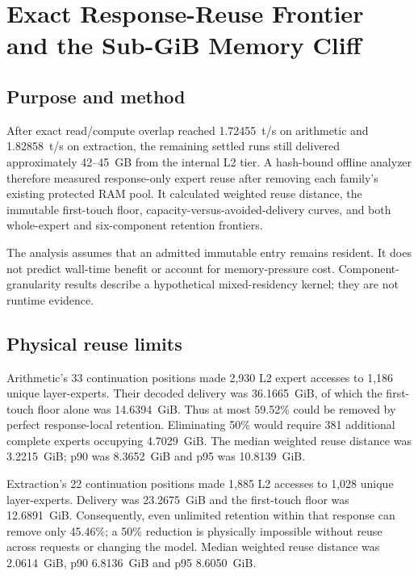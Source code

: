 
\section{Exact Response-Reuse Frontier and the Sub-GiB Memory Cliff}
\label{sec:gptoss120b-exact-reuse-frontier}

\subsection{Purpose and method}

After exact read/compute overlap reached 1.72455~t/s on arithmetic and
1.82858~t/s on extraction, the remaining settled runs still delivered
approximately 42--45~GB from the internal L2 tier.  A hash-bound offline
analyzer therefore measured response-only expert reuse after removing each
family's existing protected RAM pool.  It calculated weighted reuse distance,
the immutable first-touch floor, capacity-versus-avoided-delivery curves, and
both whole-expert and six-component retention frontiers.

The analysis assumes that an admitted immutable entry remains resident.  It
does not predict wall-time benefit or account for memory-pressure cost.
Component-granularity results describe a hypothetical mixed-residency kernel;
they are not runtime evidence.

\subsection{Physical reuse limits}

Arithmetic's 33 continuation positions made 2,930 L2 expert accesses to 1,186
unique layer-experts.  Their decoded delivery was 36.1665~GiB, of which the
first-touch floor alone was 14.6394~GiB.  Thus at most 59.52\% could be removed
by perfect response-local retention.  Eliminating 50\% would require 381
additional complete experts occupying 4.7029~GiB.  The median weighted reuse
distance was 3.2215~GiB; p90 was 8.3652~GiB and p95 was 10.8139~GiB.

Extraction's 22 continuation positions made 1,885 L2 accesses to 1,028 unique
layer-experts.  Delivery was 23.2675~GiB and the first-touch floor was
12.6891~GiB.  Consequently, even unlimited retention within that response can
remove only 45.46\%; a 50\% reduction is physically impossible without reuse
across requests or changing the model.  Median weighted reuse distance was
2.0614~GiB, p90 6.8136~GiB and p95 8.6050~GiB.

